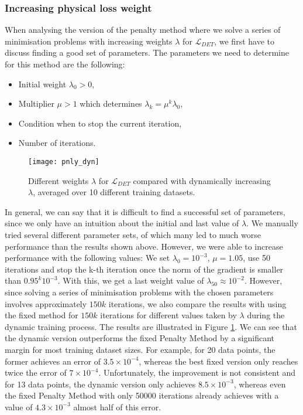 \subsubsection{Increasing physical loss weight}
When analysing the version of the penalty method where we solve a series of minimisation problems with increasing weights $\lambda$ for $\mathcal{L}_{DET}$, we first have to discuss finding a good set of parameters. The parameters we need to determine for this method are the following:
\begin{itemize}
	\item Initial weight $\lambda_0 > 0$,
	\item Multiplier $\mu > 1$ which determines $\lambda_k = \mu^k\lambda_0$,
	\item Condition when to stop the current iteration,
	\item Number of iterations.
\end{itemize}
\begin{figure}[H]
	\texttt{[image: pnly\_dyn]}
	\caption{Different weights $\lambda$ for $\mathcal{L}_{DET}$ compared with dynamically increasing $\lambda$, averaged over 10 different training datasets.}
	\label{fig:pnly_dyn}
\end{figure}
In general, we can say that it is difficult to find a successful set of parameters, since we only have an intuition about the initial and last value of $\lambda$. We manually tried several different parameter sets, of which many led to much worse performance than the results shown above. However, we were able to increase performance with the following values: We set $\lambda_0 = 10^{-3}$, $\mu = 1.05$, use 50 iterations and stop the k-th iteration once the norm of the gradient is smaller than $0.95^{k} 10^{-3}$. With this, we get a last weight value of $\lambda_{50} \approx 10^{-2}$. However, since solving a series of minimisation problems with the chosen parameters involves approximately $150k$ iterations, we also compare the results with using the fixed method for $150k$ iterations for different values taken by $\lambda$ during the dynamic training process. The results are illustrated in Figure \ref{fig:pnly_dyn}. We can see that the dynamic version outperforms the fixed Penalty Method by a significant margin for most training dataset sizes. For example, for 20 data points, the former achieves an error of $3.5\times 10^{-4}$, whereas the best fixed version only reaches twice the error of $7\times 10^{-4}$. Unfortunately, the improvement is not consistent and for 13 data points, the dynamic version only achieves $8.5 \times 10^{-3}$, whereas even the fixed Penalty Method with only 50000 iterations already achieves with a value of $4.3 \times 10^{-3}$ almost half of this error.

